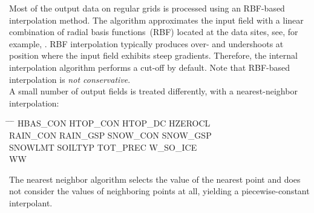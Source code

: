 Most of the output data on regular grids is processed using an RBF-based interpolation method.
The algorithm  approximates the input field with a linear combination of 
radial basis functions~(RBF) located at the data sites, see, for example, \cite{Ruppert2007}.
RBF interpolation typically produces over- and undershoots at position where the input field
exhibits steep gradients.
Therefore, the internal interpolation algorithm performs a cut-off by default.
Note that RBF-based interpolation is \emph{not conservative}.\\

A small number of output fields is treated differently, with a nearest-neighbor interpolation:
\begin{tabbing}
  \hspace{0.2\textwidth} \= \hspace{0.2\textwidth} \= \hspace{0.2\textwidth} \= \hspace{0.2\textwidth} \kill
  HBAS\_CON\footnotemark[6]  \>
  HTOP\_CON\footnotemark[6]  \>
  HTOP\_DC\footnotemark[6]   \>  
  HZEROCL\footnotemark[6]    \\
  RAIN\_CON  \>
  RAIN\_GSP  \>   
  SNOW\_CON  \>
  SNOW\_GSP  \\
  SNOWLMT    \>
  SOILTYP    \>
  TOT\_PREC  \>
  W\_SO\_ICE \\
  WW   
\end{tabbing}
The nearest neighbor algorithm selects the value of the nearest point and does
not consider the values of neighboring points at all, yielding a piecewise-constant interpolant. 




%  

